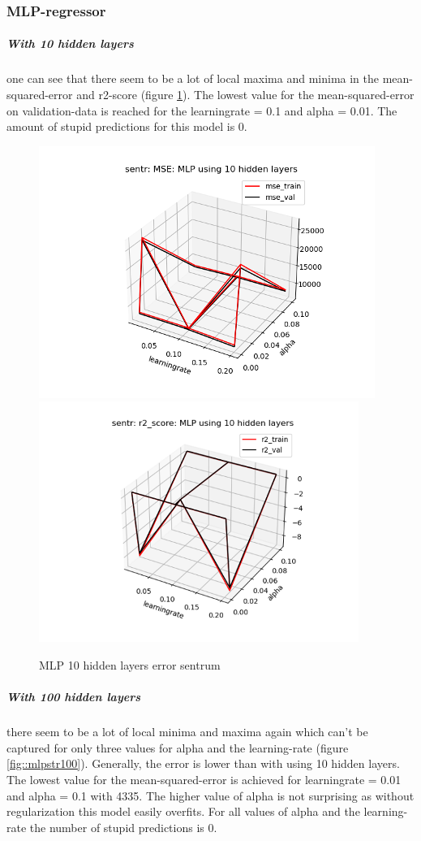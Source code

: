 \documentclass[12pt,a4paper]{scrartcl}		%
\begin{document}
\subsubsection{MLP-regressor}
\subparagraph{With 10 hidden layers}
one can see that there seem to be a lot of local maxima and minima in the mean-squared-error and r2-score (figure \ref{fig::mlpstr10}). The lowest value for the 
mean-squared-error on validation-data is reached for the learningrate = 0.1 and alpha = 0.01. The amount of stupid predictions for this model is 0.
\begin{figure}[h]
    \centering
    \includegraphics[scale = 1]{sntr_mlp_mse_10.png}
    \includegraphics[scale = 1]{sntr_mlp_r2_10.png}
    \caption{MLP 10 hidden layers error sentrum}
    \label{fig::mlpstr10}
\end{figure}

\subparagraph{With 100 hidden layers}
there seem to be a lot of local minima and maxima again which can’t be captured for only three values for alpha and the learning-rate (figure \ref{fig::mlpstr100}). 
Generally, the error is lower than with using 10 hidden layers. The lowest value for the mean-squared-error is achieved for learningrate = 0.01 and alpha = 0.1 with 4335. 
The higher value of alpha is not surprising as without regularization this model easily overfits. For all values of alpha and the learning-rate the number of stupid 
predictions is 0.
\end{document}
